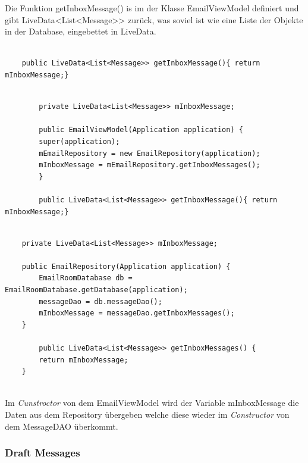 \documentclass[a4paper,11pt]{article}
\begin{document}
Die Funktion getInboxMessage() is im der Klasse EmailViewModel definiert und gibt LiveData<List<Message>> zurück, was soviel ist wie eine Liste der Objekte in der Database, eingebettet 
in LiveData.

\lstset{language=java}
\begin{lstlisting}

    public LiveData<List<Message>> getInboxMessage(){ return mInboxMessage;}

\end{lstlisting}

\lstset{language=java}
\begin{lstlisting}

        private LiveData<List<Message>> mInboxMessage;

        public EmailViewModel(Application application) {
        super(application);
        mEmailRepository = new EmailRepository(application);
        mInboxMessage = mEmailRepository.getInboxMessages();
        }

        public LiveData<List<Message>> getInboxMessage(){ return mInboxMessage;}

\end{lstlisting}


\lstset{language=java}
\begin{lstlisting}

    private LiveData<List<Message>> mInboxMessage;

    public EmailRepository(Application application) {
        EmailRoomDatabase db = EmailRoomDatabase.getDatabase(application);
        messageDao = db.messageDao();
        mInboxMessage = messageDao.getInboxMessages();
    }

        public LiveData<List<Message>> getInboxMessages() {
        return mInboxMessage;
    }


\end{lstlisting}

Im \textit{Cunstroctor} von dem EmailViewModel wird der Variable mInboxMessage die Daten aus dem Repository übergeben welche diese wieder im \textit{Constructor} von dem MessageDAO überkommt.


\subsubsection{Draft Messages}

\begingroup
\setlength{\intextsep}{1pt}
\setlength{\columnsep}{4pt}
\end{document}
